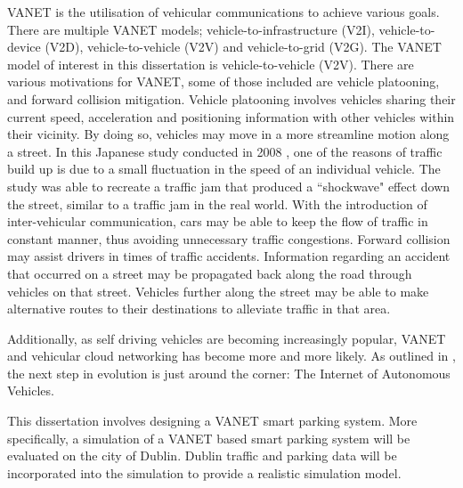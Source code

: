 \ac{VANET} is the utilisation of vehicular communications to achieve various goals. There are multiple \ac{VANET} models; vehicle-to-infrastructure (V2I), vehicle-to-device (V2D), vehicle-to-vehicle (V2V) and vehicle-to-grid (V2G). The \ac{VANET} model of interest in this dissertation is vehicle-to-vehicle (V2V). There are various motivations for \ac{VANET}, some of those included are vehicle platooning, and forward collision mitigation. Vehicle platooning involves vehicles sharing their current speed, acceleration and positioning information with other vehicles within their vicinity. By doing so, vehicles may move in a more streamline motion along a street. In this Japanese study conducted in 2008 \citep{Sugiyamal2008TrafficJam}, one of the reasons of traffic build up is due to a small fluctuation in the speed of an individual vehicle. The study was able to recreate a traffic jam that produced a ``shockwave" effect down the street, similar to a traffic jam in the real world. With the introduction of inter-vehicular communication, cars may be able to keep the flow of traffic in constant manner, thus avoiding unnecessary traffic congestions. Forward collision may assist drivers in times of traffic accidents. Information regarding an accident that occurred on a street may be propagated back along the road through vehicles on that street. Vehicles further along the street may be able to make alternative routes to their destinations to alleviate traffic in that area.

Additionally, as self driving vehicles are becoming increasingly popular, \ac{VANET} and vehicular cloud networking has become more and more likely. As outlined in \citep{Gerla2014InternetClouds}, the next step in evolution is just around the corner: The Internet of Autonomous Vehicles.

This dissertation involves designing a \ac{VANET} smart parking system. More specifically, a simulation of a \ac{VANET} based smart parking system will be evaluated on the city of Dublin. Dublin traffic and parking data will be incorporated into the simulation to provide a realistic simulation model.